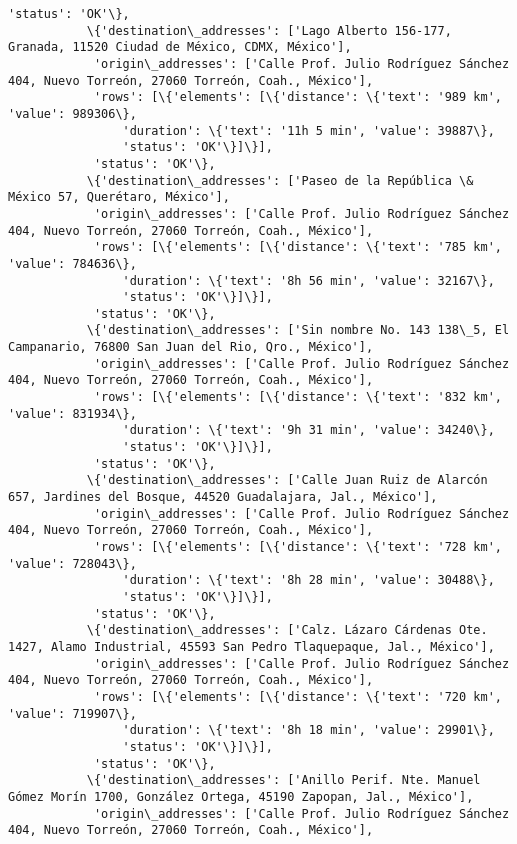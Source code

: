 \documentclass[11pt]{article}
\begin{document}
\begin{Verbatim}[commandchars=\\\{\}]
            'status': 'OK'\},
           \{'destination\_addresses': ['Lago Alberto 156-177, Granada, 11520 Ciudad de México, CDMX, México'],
            'origin\_addresses': ['Calle Prof. Julio Rodríguez Sánchez 404, Nuevo Torreón, 27060 Torreón, Coah., México'],
            'rows': [\{'elements': [\{'distance': \{'text': '989 km', 'value': 989306\},
                'duration': \{'text': '11h 5 min', 'value': 39887\},
                'status': 'OK'\}]\}],
            'status': 'OK'\},
           \{'destination\_addresses': ['Paseo de la República \& México 57, Querétaro, México'],
            'origin\_addresses': ['Calle Prof. Julio Rodríguez Sánchez 404, Nuevo Torreón, 27060 Torreón, Coah., México'],
            'rows': [\{'elements': [\{'distance': \{'text': '785 km', 'value': 784636\},
                'duration': \{'text': '8h 56 min', 'value': 32167\},
                'status': 'OK'\}]\}],
            'status': 'OK'\},
           \{'destination\_addresses': ['Sin nombre No. 143 138\_5, El Campanario, 76800 San Juan del Rio, Qro., México'],
            'origin\_addresses': ['Calle Prof. Julio Rodríguez Sánchez 404, Nuevo Torreón, 27060 Torreón, Coah., México'],
            'rows': [\{'elements': [\{'distance': \{'text': '832 km', 'value': 831934\},
                'duration': \{'text': '9h 31 min', 'value': 34240\},
                'status': 'OK'\}]\}],
            'status': 'OK'\},
           \{'destination\_addresses': ['Calle Juan Ruiz de Alarcón 657, Jardines del Bosque, 44520 Guadalajara, Jal., México'],
            'origin\_addresses': ['Calle Prof. Julio Rodríguez Sánchez 404, Nuevo Torreón, 27060 Torreón, Coah., México'],
            'rows': [\{'elements': [\{'distance': \{'text': '728 km', 'value': 728043\},
                'duration': \{'text': '8h 28 min', 'value': 30488\},
                'status': 'OK'\}]\}],
            'status': 'OK'\},
           \{'destination\_addresses': ['Calz. Lázaro Cárdenas Ote. 1427, Alamo Industrial, 45593 San Pedro Tlaquepaque, Jal., México'],
            'origin\_addresses': ['Calle Prof. Julio Rodríguez Sánchez 404, Nuevo Torreón, 27060 Torreón, Coah., México'],
            'rows': [\{'elements': [\{'distance': \{'text': '720 km', 'value': 719907\},
                'duration': \{'text': '8h 18 min', 'value': 29901\},
                'status': 'OK'\}]\}],
            'status': 'OK'\},
           \{'destination\_addresses': ['Anillo Perif. Nte. Manuel Gómez Morín 1700, González Ortega, 45190 Zapopan, Jal., México'],
            'origin\_addresses': ['Calle Prof. Julio Rodríguez Sánchez 404, Nuevo Torreón, 27060 Torreón, Coah., México'],

\end{Verbatim}
\end{document}
